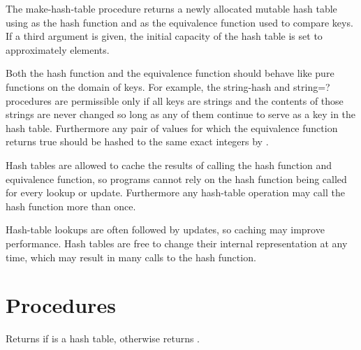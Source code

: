 \begin{entry}{%
}

The {\cf make-hash-table} procedure returns a newly allocated mutable
hash table using  
as the hash function and  as the equivalence function used to 
compare keys.
If a third argument is given, the 
initial capacity of the hash table is set to approximately  elements.

Both the hash function  and the equivalence
function  should behave like pure functions
on the domain of keys.  For example, the {\cf string-hash}
and {\cf string=?} procedures are permissible only if all
keys are strings and the contents of those strings are never
changed so long as any of them continue to serve as a key in
the hash table.  Furthermore any pair of values for which
the equivalence function  returns true should
be hashed to the same exact integers by 
.

\begin{note}
Hash tables are allowed to cache the results of calling the
hash function and equivalence function, so programs cannot
rely on the hash function being called for every lookup or
update.  Furthermore any hash-table operation may call the
hash function more than once.
\end{note}

\begin{rationale}
Hash-table lookups are often followed by updates, so caching
may improve performance.  Hash tables are free to change
their internal representation at any time, which may result
in many calls to the hash function.
\end{rationale}

\end{entry}

\section{Procedures}

\begin{entry}{%
}

Returns \schtrue{} if  is a hash table,
otherwise returns \schfalse{}.
\end{entry}

